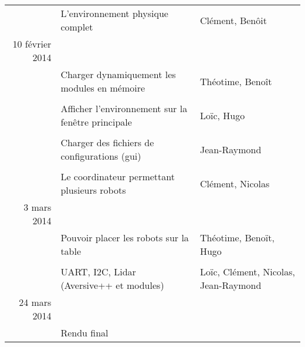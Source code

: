 \begin{tabular}{rp{8cm}|p{3cm}}
    &
    L'environnement physique complet &
    Clément, Benôit \\
    
    10 février 2014 &&\\
    
    &
    Charger dynamiquement les modules en mémoire &
    Théotime, Benoît \\
    
    &&\\
    
    &
    Afficher l'environnement sur la fenêtre principale &
    Loïc, Hugo \\
    
    &&\\
    
    &
    Charger des fichiers de configurations (gui) &
    Jean-Raymond \\
    
    &&\\
    
    &
    Le coordinateur permettant plusieurs robots &
    Clément, Nicolas \\
    
    3 mars 2014 &&\\
    
    &
    Pouvoir placer les robots sur la table &
    Théotime, Benoït, Hugo \\
    
    &&\\
    
    &
    UART, I2C, Lidar (Aversive++ et modules) &
    Loïc, Clément, Nicolas, Jean-Raymond \\
    
    24 mars 2014 &&\\
    
    &
    Rendu final &
    \\
    
\end{tabular}
